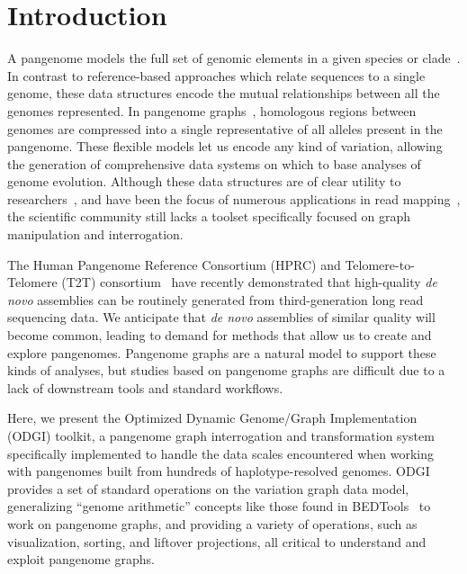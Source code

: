 \documentclass{bioinfo}
\begin{document}
\maketitle

\section{Introduction}
A pangenome models the full set of genomic elements in a given species or clade~\citep{cpang2018,Eizenga_2020}.
In contrast to reference-based approaches which relate sequences to a single genome, these data structures encode the mutual relationships between all the genomes represented.
In pangenome graphs~\citep{Paten:2017}, homologous regions between genomes are compressed into a single representative of all alleles present in the pangenome.
These flexible models let us encode any kind of variation, allowing the generation of comprehensive data systems on which to base analyses of genome evolution.
Although these data structures are of clear utility to researchers~\citep{cpang2018}, and have been the focus of numerous applications in read mapping~\citep{Garrison:2018,Baaijens_2019,Hickey:2020,Sibbesen_2021}, the scientific community still lacks a toolset specifically focused on graph manipulation and interrogation.

The Human Pangenome Reference Consortium (HPRC) and Telomere-to-Telomere (T2T) consortium~\citep{Miga:2020, Logsdon_2021, Nurk_2021} have recently demonstrated that high-quality \textit{de novo} assemblies can be routinely generated from third-generation long read sequencing data.
We anticipate that \textit{de novo} assemblies of similar quality will become common, leading to demand for methods that allow us to create and explore pangenomes.
Pangenome graphs are a natural model to support these kinds of analyses, but studies based on pangenome graphs are difficult due to a lack of downstream tools and standard workflows.

Here, we present the Optimized Dynamic Genome/Graph Implementation (ODGI) toolkit, a pangenome graph interrogation and transformation system specifically implemented to handle the data scales encountered when working with pangenomes built from hundreds of haplotype-resolved genomes.
ODGI provides a set of standard operations on the variation graph data model, generalizing ``genome arithmetic'' concepts like those found in BEDTools~\citep{Quinlan_2010} to work on pangenome graphs, and providing a variety of operations, such as visualization, sorting, and liftover projections, all critical to understand and exploit pangenome graphs.
\end{document}

